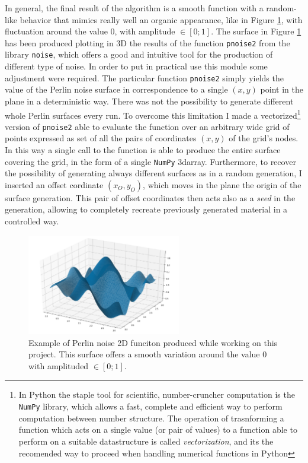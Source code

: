     In general, the final result of the algorithm is a smooth function with a random-like behavior that mimics really well an organic appearance, like in Figure \ref{fig:my_perlin}, with fluctuation around the value 0, with amplitude $ \in [ 0;1] $. The surface in Figure \ref{fig:my_perlin} has been produced plotting in 3D the results of the function \texttt{pnoise2} from the library \texttt{noise}, which offers a good and intuitive tool for the production of different type of noise. In order to put in practical use this module some adjustment were required. The particular function \texttt{pnoise2} simply yields the value of the Perlin noise surface in correspondence to a single $(x,y)$ point in the plane in a deterministic way. There was not the possibility to generate different whole Perlin surfaces every run. To overcome this limitation I made a vectorized\footnote{In Python the staple tool for scientific, number-cruncher computation is the \texttt{NumPy} library, which allows a fast, complete and efficient way to perform computation between number structure. The operation of trasnforming a function which acts on a single value (or pair of values) to a function able to perform on a suitable datastructure is called \textit{vectorization}, and its the recomended way to proceed when handling numerical functions in Python} version of \texttt{pnoise2} able to evaluate the function over an arbitrary wide grid of points expressed as set of all the pairs of coordinates $(x,y)$ of the grid's nodes. In this way a single call to the function is able to produce the entire surface covering the grid, in the form of a single \texttt{NumPy} 3darray. Furthermore, to recover the possibility of generating always different surfaces as in a random generation, I inserted an offset cordinate $(x_O,y_O)$, which moves in the plane the origin of the surface generation. This pair of offset coordinates then acts also as a \textit{seed} in the generation, allowing to completely recreate previously generated material in a controlled way.

    \begin{figure}
        \centering
        \includegraphics[width = 0.6\textwidth]{images/perlin}
        \caption{Example of Perlin noise 2D funciton produced while working on this project. This surface offers a smooth variation around the value 0 with amplituded $ \in [ 0;1] $.}
        \label{fig:my_perlin}
    \end{figure}

